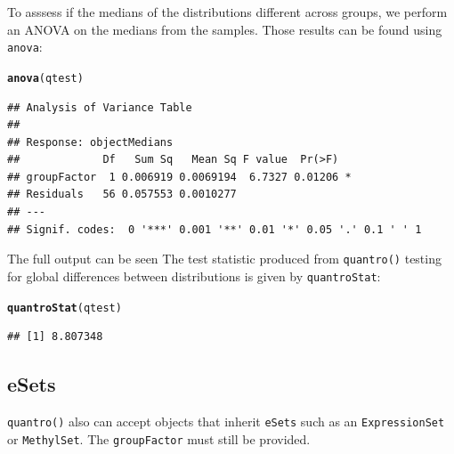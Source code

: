 \documentclass{article}\usepackage[]{graphicx}\usepackage[usenames,dvipsnames]{color}
\makeatletter
\newcommand{\hlstd}[1]{\textcolor[rgb]{0.345,0.345,0.345}{#1}}%
\newcommand{\hlkwd}[1]{\textcolor[rgb]{0.737,0.353,0.396}{\textbf{#1}}}%
\newenvironment{kframe}{%
 \def\at@end@of@kframe{}%
 \ifinner\ifhmode%
  \def\at@end@of@kframe{\end{minipage}}%
  \begin{minipage}{\columnwidth}%
 \fi\fi%
 \def\FrameCommand##1{\hskip\@totalleftmargin \hskip-\fboxsep
 \colorbox{shadecolor}{##1}\hskip-\fboxsep
     \hskip-\linewidth \hskip-\@totalleftmargin \hskip\columnwidth}%
 \MakeFramed {\advance\hsize-\width
   \@totalleftmargin\z@ \linewidth\hsize
   \@setminipage}}%
 {\par\unskip\endMakeFramed%
 \at@end@of@kframe}
\newenvironment{knitrout}{}{} %
\makeatother
\begin{document}
To asssess if the medians of the distributions different across groups, 
we perform an ANOVA on the medians from the samples. Those results can be 
found using \texttt{anova}:

\begin{knitrout}
\color{fgcolor}\begin{kframe}
\begin{alltt}
\hlkwd{anova}\hlstd{(qtest)}
\end{alltt}
\begin{verbatim}
## Analysis of Variance Table
## 
## Response: objectMedians
##             Df   Sum Sq   Mean Sq F value  Pr(>F)  
## groupFactor  1 0.006919 0.0069194  6.7327 0.01206 *
## Residuals   56 0.057553 0.0010277                  
## ---
## Signif. codes:  0 '***' 0.001 '**' 0.01 '*' 0.05 '.' 0.1 ' ' 1
\end{verbatim}
\end{kframe}
\end{knitrout}

The full output can be seen The test statistic produced from 
\texttt{quantro()} testing for global differences between distributions 
is given by \texttt{quantroStat}: 

\begin{knitrout}
\color{fgcolor}\begin{kframe}
\begin{alltt}
\hlkwd{quantroStat}\hlstd{(qtest)}
\end{alltt}
\begin{verbatim}
## [1] 8.807348
\end{verbatim}
\end{kframe}
\end{knitrout}



\subsection{eSets}
\texttt{quantro()} also can accept objects that inherit \texttt{eSets} 
such as an \texttt{ExpressionSet} or \texttt{MethylSet}. The 
\texttt{groupFactor} must still be provided.  
\end{document}
